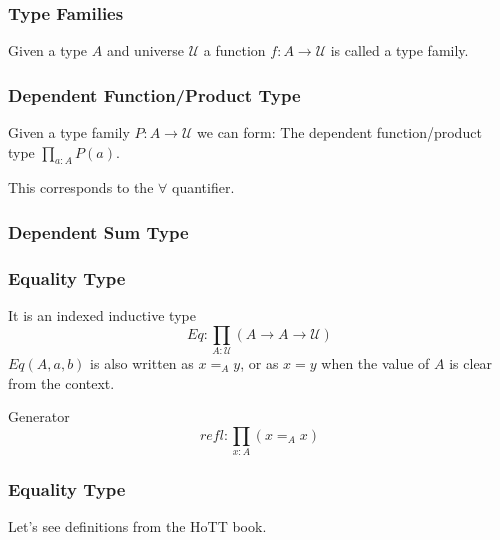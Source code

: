 \documentclass[14pt,compress]{beamer}
\newcommand{\U}{\mathcal{U}}
\begin{document}
\begin{frame}\label{frame : universes and type families}
\frametitle{Type Families}
Given a type $A$ and universe $\U$ a function $f : A \to \U$ is called a
\textcolor{beamer@mathtext}{type family}.

\end{frame}

\begin{frame}\label{frame : dependent function type}
\frametitle{Dependent Function/Product Type}

Given a type family \textcolor{beamer@mathtext}{$P : A \to \U $} we can form:
The \textcolor{beamer@deepblue}{dependent function/product type}
\textcolor{beamer@mathtext}{$\prod_{a : A} P(a)$}.\smallskip

\pause
This corresponds to the \textcolor{beamer@mathtext}{$\forall$} quantifier.

\end{frame}

\begin{frame}\label{frame : dependent sum type}
\frametitle{Dependent Sum Type}

\end{frame}

\begin{frame}\label{frame : equality type}
\frametitle{Equality Type}
It is an indexed inductive type
\textcolor{beamer@mathtext}{\[ Eq : \prod_{A : \U} (A \to A \to \U) \]}
$Eq(A,a,b)$ is also written as \textcolor{beamer@mathtext}{$x =_A y$},
or as \textcolor{beamer@mathtext}{$x = y$} when the value of $A$ is clear from the context.
\pause
\begin{block}{Generator}
\textcolor{beamer@mathtext}{\[ refl : \prod_{x : A} (x =_A x) \]}
\end{block}

\end{frame}

\begin{frame}\label{frame : equality type recursor}
\frametitle{Equality Type}
Let's see definitions from the HoTT book.

\end{frame}

\end{document}
